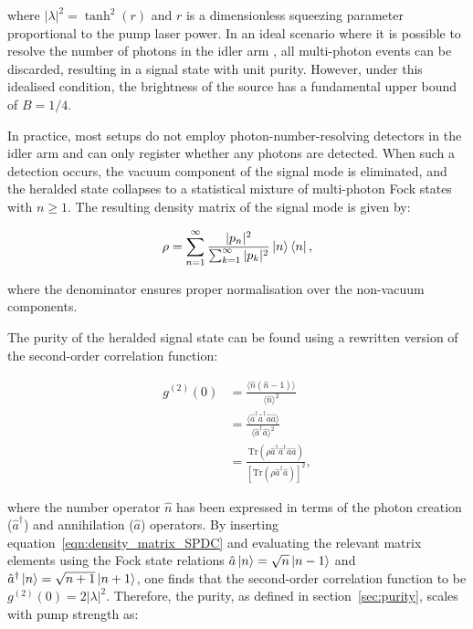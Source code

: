 where $|\lambda|^2 = \tanh^2(r)$ and $r$ is a dimensionless squeezing parameter proportional to the pump laser power. In an ideal scenario where it is possible to resolve the number of photons in the idler arm \cite{Davis2022, Sempere-Llagostera2022a}, all multi-photon events can be discarded, resulting in a signal state with unit purity. However, under this idealised condition, the brightness of the source has a fundamental upper bound of $B = 1/4$.

In practice, most setups do not employ photon-number-resolving detectors in the idler arm and can only register whether any photons are detected. When such a detection occurs, the vacuum component of the signal mode is eliminated, and the heralded state collapses to a statistical mixture of multi-photon Fock states with $n \geq 1$. The resulting density matrix of the signal mode is given by:

\begin{equation}
    \rho = \sum_{n=1}^{\infty} \frac{|p_n|^2}{\sum_{k=1}^{\infty} |p_k|^2} \ket{n}\bra{n},
    \label{eqn:density_matrix_SPDC}
\end{equation}

where the denominator ensures proper normalisation over the non-vacuum components.

The purity of the heralded signal state can be found using a rewritten version of the second-order correlation function:

\begin{equation}
\begin{aligned}
    g^{(2)}(0) &= \frac{\langle \hat{n}(\hat{n} - 1) \rangle}{\langle \hat{n} \rangle^2} \\
    &= \frac{\langle \hat{a}^\dagger \hat{a}^\dagger \hat{a} \hat{a} \rangle}{\langle \hat{a}^\dagger \hat{a} \rangle^2} \\
    &= \frac{\mathrm{Tr}(\rho \hat{a}^\dagger \hat{a}^\dagger \hat{a} \hat{a})}{\left[\mathrm{Tr}(\rho \hat{a}^\dagger \hat{a})\right]^2},
\end{aligned}
\end{equation}

where the number operator $\hat{n}$ has been expressed in terms of the photon creation ($\hat{a}^\dagger$) and annihilation ($\hat{a}$) operators. By inserting equation~\ref{eqn:density_matrix_SPDC} and evaluating the relevant matrix elements using the Fock state relations $\hat{a} \ket{n} = \sqrt{n} \ket{n-1}$ and $\hat{a}^\dagger \ket{n} = \sqrt{n+1} \ket{n+1}$, one finds that the second-order correlation function to be $g^{(2)}(0) = 2|\lambda|^2$. Therefore, the purity, as defined in section~\ref{sec:purity}, scales with pump strength as:

